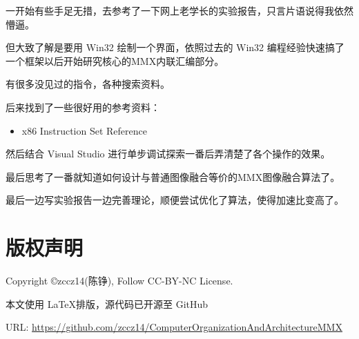 一开始有些手足无措，去参考了一下网上老学长的实验报告，只言片语说得我依然懵逼。

但大致了解是要用 Win32 绘制一个界面，依照过去的 Win32 编程经验快速搞了一个框架以后开始研究核心的MMX内联汇编部分。

有很多没见过的指令，各种搜索资料。

后来找到了一些很好用的参考资料：

\begin{itemize}
    \item x86 Instruction Set Reference \cite{x86_renejeschke_de}
\end{itemize}

然后结合 Visual Studio 进行单步调试探索一番后弄清楚了各个操作的效果。

最后思考了一番就知道如何设计与普通图像融合等价的MMX图像融合算法了。

最后一边写实验报告一边完善理论，顺便尝试优化了算法，使得加速比变高了。

\section{版权声明}

Copyright \copyright zccz14(陈铮), Follow CC-BY-NC License.

本文使用 \LaTeX 排版，源代码已开源至 GitHub

URL: \href{https://github.com/zccz14/ComputerOrganizationAndArchitectureMMX}{https://github.com/zccz14/ComputerOrganizationAndArchitectureMMX}